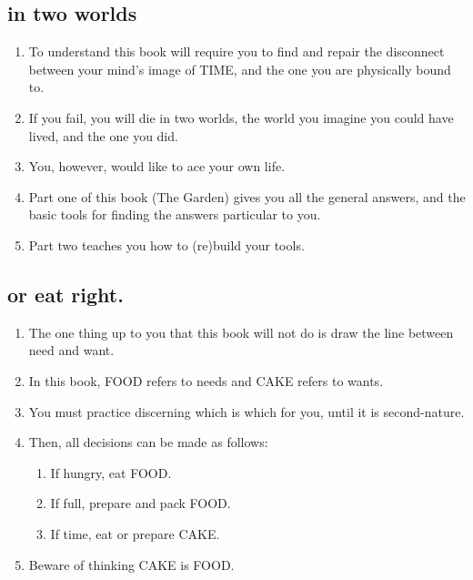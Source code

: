 \documentclass[
]{book}
\providecommand{\tightlist}{%
  \setlength{\itemsep}{0pt}\setlength{\parskip}{0pt}}
\begin{document}
\hypertarget{in-two-worlds}{%
\subsection{in two worlds}\label{in-two-worlds}}

\begin{enumerate}
\def\labelenumi{\arabic{enumi}.}
\setcounter{enumi}{17}
\item
  To understand this book will require you to find and repair the disconnect between your mind's image of TIME, and the one you are physically bound to.
\item
  If you fail, you will die in two worlds, the world you imagine you could have
  lived, and the one you did.
\item
  You, however, would like to ace your own life.
\item
  Part one of this book (The Garden) gives you all the general answers, and the basic tools for finding the answers particular to you.
\item
  Part two teaches you how to (re)build your tools.
\end{enumerate}

\hypertarget{or-eat-right.}{%
\subsection{or eat right.}\label{or-eat-right.}}

\begin{enumerate}
\def\labelenumi{\arabic{enumi}.}
\setcounter{enumi}{22}
\tightlist
\item
  The one thing up to you that this book will not do is draw the line between need and want.
\item
  In this book, FOOD refers to needs and CAKE refers to wants.
\item
  You must practice discerning which is which for you, until it is second-nature.
\item
  Then, all decisions can be made as follows:

  \begin{enumerate}
  \def\labelenumii{\arabic{enumii}.}
  \tightlist
  \item
    If hungry, eat FOOD.
  \item
    If full, prepare and pack FOOD.
  \item
    If time, eat or prepare CAKE.
  \end{enumerate}
\item
  Beware of thinking CAKE is FOOD.
\end{enumerate}
\end{document}

